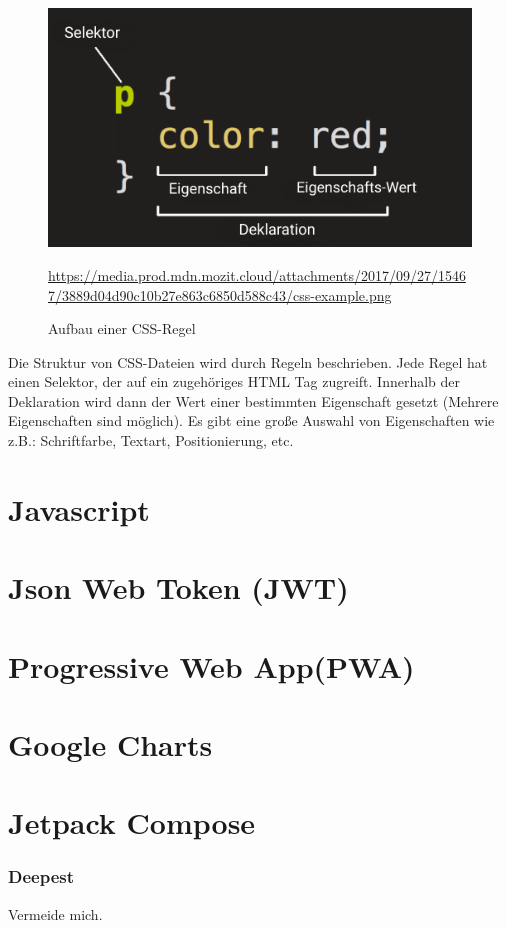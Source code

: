 \begin{figure}[htp]
    \centering
    \includegraphics[scale=0.3]{pics/CSSRegel.png}
    \caption{Aufbau einer CSS-Regel}
        \small \url{https://media.prod.mdn.mozit.cloud/attachments/2017/09/27/15467/3889d04d90c10b27e863c6850d588c43/css-example.png}
    \label{fig:impl:CSSRule}
\end{figure}

Die Struktur von CSS-Dateien wird durch Regeln beschrieben. Jede Regel hat einen Selektor, der auf ein zugehöriges HTML Tag zugreift.
Innerhalb der Deklaration wird dann der Wert einer bestimmten Eigenschaft gesetzt (Mehrere Eigenschaften sind möglich).
Es gibt eine große Auswahl von Eigenschaften wie z.B.: Schriftfarbe, Textart, Positionierung, etc. \cite{CSSMozilla}
\section{Javascript}

\section{Json Web Token (JWT)}

\section{Progressive Web App(PWA)}

\section{Google Charts}

\section{Jetpack Compose}

\subsubsection{Deepest}
Vermeide mich.